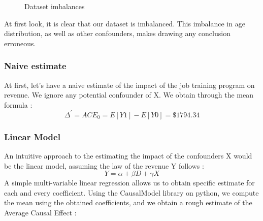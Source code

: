 \documentclass{article}
\begin{document}
\begin{figure}[!tbp]
  \centering
  \hfill
  \caption{Dataset imbalances}
\end{figure}



At first look, it is clear that our dataset is imbalanced. This imbalance in age distribution, as well as other confounders, makes drawing any conclusion erroneous. 




\subsubsection{Naive estimate}

At first, let's have a naive estimate of the impact of the job training program on revenue.
We ignore any potential confounder of X. We obtain through the mean formula :
$$ \Delta^{'} = ACE_{0} = E[Y1] - E[Y0]= \$ 1794.34 $$


\subsubsection{Linear Model}

An intuitive approach to the estimating the impact of the confounders X would be the linear model, assuming the law of the revenue Y follows :
$$ Y = \alpha + \beta D + \gamma X
$$
A simple multi-variable linear regression allows us to obtain specific estimate for each and every coefficient.
Using the CausalModel library on python, we compute the mean using the obtained coefficients, and we obtain a rough estimate of the Average Causal Effect : 
\end{document}

